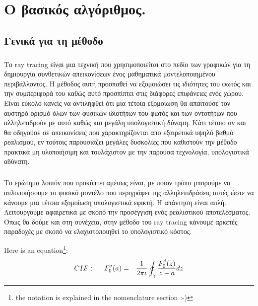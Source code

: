 \chapter{Ο βασικός αλγόριθμος.}

\ifpdf
    \graphicspath{{Chapter1/Chapter1Figs/PNG/}{Chapter1/Chapter1Figs/PDF/}{Chapter1/Chapter1Figs/}}
\else
    \graphicspath{{Chapter1/Chapter1Figs/EPS/}{Chapter1/Chapter1Figs/}}
\fi

\section{Γενικά για τη μέθοδο}

\begin{sloppypar}

\paragraph{}
	Το ray tracing είναι μια τεχνική που χρησιμοποιείται στο πεδίο των γραφικών για τη
δημιουργία συνθετικών απεικονίσεων ένος μαθηματικά μοντελοποιημένου περιβάλλοντος. Η μέθοδος
αυτή προσπαθεί να εξομοιώσει τις ιδιότητες του φωτός και την συμπεριφορά του καθώς αυτό προσπίπτει
στις διάφορες επιφάνειες ενός χώρου. Είναι εύκολο κανείς να αντιληφθεί ότι μια τέτοια εξομοίωση θα
απαιτούσε τον αυστηρό ορισμό όλων των φυσικών ιδιοτήτων του φωτός και των οντοτήτων που αλληλεπιδρούν
με αυτό καθώς και μεγάλη υπολογιστική δύναμη. Κάτι τέτοιο αν και θα οδηγούσε σε απεικονίσεις που 
χαρακτηρίζονται απο εξαιρετικά υψηλό βαθμό ρεαλισμού, εν τούτοις παρουσιάζει μεγάλες δυσκολίες που 
καθιστούν την μέθοδο πρακτικά μη υλοποιήσιμη και τουλάχιστον με την παρούσα τεχνολογία, 
υπολογιστικά αδύνατη.

\paragraph{}
	Το ερώτημα λοιπόν που προκύπτει αμέσως είναι, με ποιον τρόπο μπορούμε να απλοποιήσουμε το φυσικό
μοντέλο που περιγράφει της αλληλεπιδράσεις αυτές ώστε να κάνουμε μια τέτοια εξομοίωση υπολογιστικά 
εφικτή. Η απάντηση είναι απλή. Λειτουργούμε αφαιρετικά με σκοπό την προσέγγιση ενός ρεαλιστικού
αποτελέσματος. Όπως θα δούμε και στη συνέχεια, στην μέθοδο του ray tracing κάνουμε αρκετές παραδοχές 
με σκοπό να ελαχιστοποιηθεί το υπολογιστικό κόστος.

\end{sloppypar}
 
	

Here is an equation\footnote{the notation is explained in the nomenclature section :-)}:
\begin{eqnarray}
CIF: \hspace*{5mm}F_0^j(a) &=& \frac{1}{2\pi \iota} \oint_{\gamma} \frac{F_0^j(z)}{z - a} dz
\end{eqnarray}

